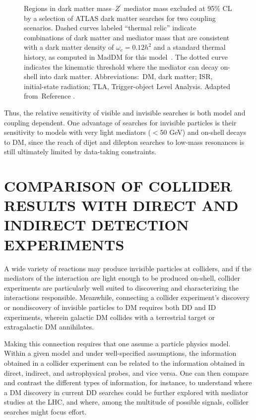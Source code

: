 \documentclass{ar-1col}
\newcommand{\IP}{invisible particle}
\newcommand{\Zprime}{\ensuremath{{Z}^\prime}\xspace}
\begin{document}
\begin{figure}[!htpb]
\caption{Regions in dark matter mass--\Zprime mediator mass
excluded at 95\% CL by a selection of ATLAS dark matter searches
for two coupling scenarios. Dashed curves labeled ``thermal
relic'' indicate combinations of dark matter and mediator mass
that are consistent with a dark matter density of $\omega_c = 0.12
h^2$ and a standard thermal history, as computed in MadDM for this
model~\cite{Backovic:2015cra}. The dotted curve indicates the
kinematic threshold where the mediator can decay on-shell into
dark matter. Abbreviations:\ DM, dark matter; ISR, initial-state radiation; TLA, Trigger-object Level Analysis. Adapted from~Reference .}
\label{fig:sensitivityComparison}
\end{figure}

Thus, the relative sensitivity of visible and invisible searches
is both model and coupling dependent. One advantage of
searches for {\IP}s is their sensitivity to models
with very light mediators ($<$50 GeV) and on-shell decays to DM, since the
reach of dijet and dilepton searches to low-mass resonances is
still ultimately limited by data-taking constraints.

\section{COMPARISON OF COLLIDER RESULTS WITH DIRECT AND INDIRECT DETECTION EXPERIMENTS}\label{sec:04_Extrapolation}

A wide variety of reactions may produce {\IP}s at colliders, and
if the mediators of the interaction are light enough to be
produced on-shell, collider experiments are particularly well suited to
discovering and characterizing the interactions responsible.
Meanwhile, connecting a collider experiment's discovery or
nondiscovery of {\IP}s to DM requires both DD and
ID experiments, wherein galactic DM
collides with a terrestrial target or extragalactic DM
annihilates.

Making this connection requires that one assume a particle
physics model. Within a given model and under well-specified
assumptions, the information obtained in a collider experiment can
be related to the information obtained in direct, indirect, and
astrophysical probes, and vice versa. One can then compare and
contrast the different types of information, for instance, to understand
where a DM discovery in current DD searches could be further
explored with mediator studies at the LHC, and where, among the
multitude of possible signals, collider searches might focus
effort.
\end{document}
